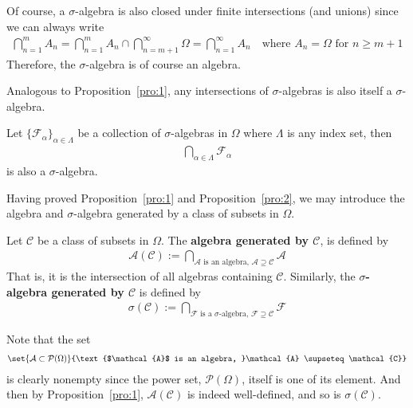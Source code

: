 \documentclass[thmcnt=section, 12pt, color=purple]{my-elegantbook}
\begin{document}
Of course, a $\sigma$-algebra is also closed under finite intersections 
(and unions)
since we can always write
\begin{align*}
	\bigcap_{n=1}^m A_n
	= \bigcap_{n=1}^m A_n \cap \bigcap_{n=m+1}^\infty \Omega
	= \bigcap_{n=1}^\infty A_n
	\quad \text{where $A_n = \Omega$ for $n \geq m+1$}
\end{align*}
Therefore, the $\sigma$-algebra is of course an algebra.

Analogous to Proposition~\ref{pro:1}, any intersections of $\sigma$-algebras
is also itself a $\sigma$-algebra.

\begin{proposition} \label{pro:2}
	Let $\{\mathcal{F}_\alpha\}_{\alpha \in \Lambda}$ 
	be a collection of $\sigma$-algebras in $\Omega$
	where $\Lambda$ is any index set,
	then 
	\begin{align*}
		\bigcap_{\alpha \in \Lambda} \mathcal{F}_{\alpha}
	\end{align*}
	is also a $\sigma$-algebra.
\end{proposition}


Having proved Proposition~\ref{pro:1} and Proposition~\ref{pro:2},
we may introduce the algebra and $\sigma$-algebra
generated by a class of subsets in $\Omega$.

\begin{definition} \label{def:4}
	Let $\mathcal{C}$ be a class of subsets in $\Omega$.
	The \textbf{algebra generated by $\mathcal{C}$}, 
	is defined by 
	\begin{align*}
		\mathcal{A}(\mathcal{C})
		:= \bigcap_{
			\text{$\mathcal{A}$ is an algebra, }\mathcal{A} 
			\supseteq \mathcal{C}
		} \mathcal{A} 
	\end{align*}
	That is, it is the intersection of all algebras 
	containing $\mathcal{C}$.
	Similarly, the \textbf{$\sigma$-algebra generated by $\mathcal{C}$}
	is defined by 
	\begin{align*}
		\sigma(\mathcal{C})
		:= \bigcap_{
			\text{$\mathcal{F}$ is a $\sigma$-algebra, }\mathcal{F} 
			\supseteq \mathcal{C}
		} \mathcal{F}
	\end{align*}
\end{definition}

Note that the set
\begin{align*}
	\set{\mathcal{A} \subset \mathcal{P}(\Omega)}
	{\text{$\mathcal{A}$ is an algebra, }\mathcal{A} \supseteq \mathcal{C}}
\end{align*}
is clearly nonempty since the power set, $\mathcal{P}(\Omega)$, 
itself is one of its element.
And then by Proposition~\ref{pro:1}, $\mathcal{A}(\mathcal{C})$
is indeed well-defined, and so is $\sigma(\mathcal{C})$.
\end{document}
